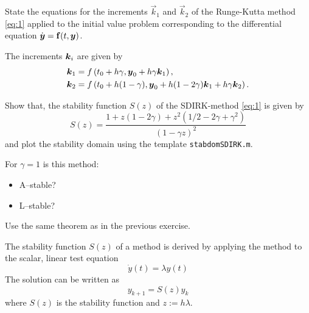 \begin{problem}
\begin{subproblem}[1]\label{sp:1}
State the equations for the increments $\vec{k}_{1}$ and $\vec{k}_{2}$ of the Runge-Kutta method \eqref{eq:1} applied to the initial value problem corresponding to the differential equation $\displaystyle \dot{{\boldsymbol{y}}} = {\mathbf{f}}(t,{\boldsymbol{y}})$.

\begin{solution}
The increments ${\boldsymbol{k}}_i$ are given by
\begin{align*}
	{\boldsymbol{k}}_1 &= f\left(t_0 + h\gamma, {\boldsymbol{y}}_0 + h\gamma{\boldsymbol{k}}_1\right),\\
	{\boldsymbol{k}}_2 &= f\left(t_0 + h(1-\gamma), {\boldsymbol{y}}_0 + h(1-2\gamma){\boldsymbol{k}}_1 + h\gamma{\boldsymbol{k}}_2\right).
\end{align*}
\end{solution}

\end{subproblem}

\begin{subproblem}[1]\label{sp:2}
Show that, the stability function $S(z)$ of the SDIRK-method \eqref{eq:1} is given by
\begin{equation*}
S(z) = \frac{1 + z(1 - 2\gamma) + z^2(1/2 - 2\gamma + \gamma^2)}{(1-\gamma z)^2}
\end{equation*}
and plot the stability domain using the template \texttt{stabdomSDIRK.m}.

For $\gamma=1$ is this method:
\begin{itemize}
	\item A--stable?
	\item L--stable?
\end{itemize}
\begin{hint}
Use the same theorem as in the previous exercise.
\end{hint}

\begin{solution}
The stability function $S(z)$ of a method is derived by applying the method to the scalar, linear test equation
\begin{equation*}
	\dot{y}(t) = \lambda y(t)
\end{equation*}
The solution can be written as
\begin{equation*}
	y_{k+1} = S(z)y_k
\end{equation*}
where $S(z)$ is the stability function and $z:= h\lambda$.


\end{solution}
\end{subproblem}
\end{problem}
